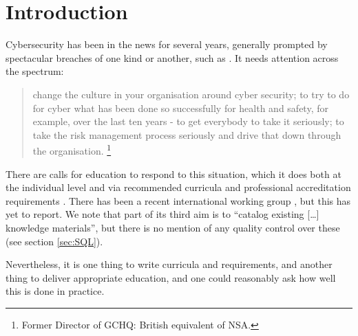 \documentclass[sigconf,anonymous]{acmart}
\begin{document}
\begin{abstract}
\end{abstract}



\maketitle

\section{Introduction}

Cybersecurity has been in the news for several years, generally prompted by spectacular breaches of one kind or another, such as \cite{BritishAirways2018a}.
It needs attention across the spectrum:
\begin{quote}
change the culture in your organisation around cyber security; to try to do for cyber what has been done so successfully for health and safety, for example, over the last ten years - to get everybody to take it seriously; to take the risk management process seriously and drive that down through the organisation. \cite{Hannigan2019a}\footnote{Former Director of GCHQ: British equivalent of NSA.}
\end{quote}

There are calls for education to respond to this situation, which it does both at the individual level and via recommended curricula \cite{ACM2013a} and professional accreditation requirements \cite{BCS2018a}. There has been a recent international working group \cite{Parrishetal2018a}, but this has yet to report.  We note that part of its third aim is to ``catalog existing [\dots] knowledge materials'', but there is no mention of any quality control over these (see section \ref{sec:SQL}).

Nevertheless, it is one thing to write curricula and requirements, and
another thing to deliver appropriate education, and one could
reasonably ask how well this is done in practice.
\end{document}
